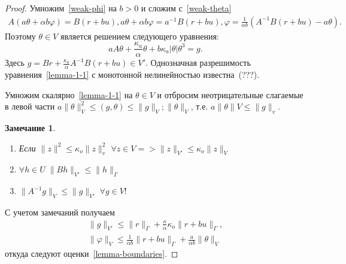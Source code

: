\documentclass[10pt]{article}
\newtheorem*{remark}{Замечание}
\begin{document}
    \begin{proof}
        Умножим~\eqref{weak-phi} на $b > 0$ и сложим с~\eqref{weak-theta}
        \begin{gather*}
            A \left( a \theta + \alpha b \varphi \right) = B(r + bu),
            a\theta + \alpha b \varphi = a^{-1}B(r + bu),
            \varphi = \frac{1}{\alpha b}(A^{-1}B(r +bu) - a\theta).
        \end{gather*}
        Поэтому $\theta \in V$ является решением следующего уравнения:
        \begin{equation}
            \label{lemma-1-1}
            a A \theta + \frac{\kappa_a}{\alpha} \theta + b\kappa_a |\theta|\theta^3 = g.
        \end{equation}
        Здесь $g = Br + \frac{\kappa_a}{\alpha}A^{-1}B(r+bu) \in V'$.
        Однозначная разрешимость уравнения~\eqref{lemma-1-1} с монотонной нелинейностью
        известна~(???).

        Умножим скалярно~\eqref{lemma-1-1} на $\theta \in V$ и отбросим неотрицательные
        слагаемые в левой части
        $a \|\theta\|^2_V \leq (g, \theta) \leq \|g\|_V; \|\theta\|_V$,
        т.е. $a\|\theta\|V \leq \|g\|_v$.

        \begin{remark}
            \begin{enumerate}
                \item Если $\|z\|^2 \leq \kappa_o\|z\|^2_v$
                $\forall z \in V => \|z\|_{V'} \leq \kappa_o \|z\|_V$
                \item $\forall h \in U \; \|Bh\|_{V'} \leq \|h\|_\Gamma$
                \item $\|A^{-1}g\|_V \leq \|g\|_{V'} \; \forall g \in V!$
            \end{enumerate}
        \end{remark}

        С учетом замечаний получаем
        \begin{gather*}
            \|g\|_{V'} \leq \|r\|_\Gamma + \frac{\kappa}{\alpha}\kappa_o \|r + bu\|_\Gamma, \\
            \|\varphi\|_V \leq \frac{1}{\alpha b} \|r + bu\|_\Gamma + \frac{a}{\alpha b} \|\theta\|_V
        \end{gather*}
        откуда следуют оценки~\eqref{lemma-boundaries}.
    \end{proof}
\end{document}
